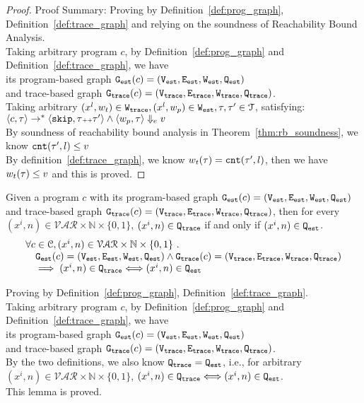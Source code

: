 \begin{proof}
Proof Summary: Proving by Definition~\ref{def:prog_graph}, Definition~\ref{def:trace_graph} and relying on the soundness of Reachability Bound 
Analysis.
\\
Taking arbitrary program $c$,
by Definition~\ref{def:prog_graph} and Definition~\ref{def:trace_graph}, 
we have   
\\
its program-based graph $\mathtt{{G_{est}}}({c}) = (\mathtt{{V_{est}}}, \mathtt{{E_{est}}}, \mathtt{{W_{est}}}, \mathtt{{Q_{est}}})$ 
\\
and 
trace-based graph $\mathtt{{G_{trace}}}({c}) = (\mathtt{{V_{trace}}}, \mathtt{{E_{trace}}}, \mathtt{{W_{trace}}}, \mathtt{{Q_{trace}}})$.
\\
Taking arbitrary 
$(x^l, w_{t}) \in \mathtt{{W_{trace}}}, (x^l, w_{p}) \in \mathtt{{W_{est}}}, \mathtt{\tau}, \mathtt{\tau}' \in \mathcal{T}$, satisfying:
\\
$\langle {c}, \mathtt{\tau} \rangle \to^{*} \langle \mathtt{skip}, \mathtt{\tau}{\scriptscriptstyle ++}\mathtt{\tau}' \rangle 
\land 
\langle w_{p}, \mathtt{\tau} \rangle \Downarrow_e v$
\\
By soundness of reachability bound analysis in Theorem~\ref{thm:rb_soundness}, we know 
$\mathtt{cnt}(\mathtt{\tau}', l) \leq v$
\\
By definition~\ref{def:trace_graph}, we know $w_t(\mathtt{\tau}) = \mathtt{cnt}(\mathtt{\tau}', l)$,
then we have $w_t(\mathtt{\tau}) \leq v$ and this is proved.
\end{proof}
%
\begin{lem}
	\label{lem:queryvertex_map}
	Given a program $c$ with its
	program-based graph $\mathtt{{G_{est}}}({c}) = (\mathtt{{V_{est}}}, \mathtt{{E_{est}}}, \mathtt{{W_{est}}}, \mathtt{{Q_{est}}})$
	and 
	trace-based graph $\mathtt{{G_{trace}}}({c}) = (\mathtt{{V_{trace}}}, \mathtt{{E_{trace}}}, \mathtt{{W_{trace}}}, \mathtt{{Q_{trace}}})$,
	then for every $(x^i, n) \in \mathcal{VAR} \times \mathbb{N}  \times \{0, 1\} $,
	 $(x^i, n) \in \mathtt{{Q_{trace}}}$ if and only if $ (x^i, n) \in \mathtt{{Q_{est}}}$.
	\[
	\begin{array}{l}
	\forall c \in \mathcal{C} , (x^i, n) \in \mathcal{VAR} \times \mathbb{N}  \times \{0, 1\} 
	 ~.~ 
	 \\ \quad
	 \mathtt{{G_{est}}}({c}) = (\mathtt{{V_{est}}}, \mathtt{{E_{est}}}, \mathtt{{W_{est}}}, \mathtt{{Q_{est}}})
	\land 
	\mathtt{{G_{trace}}}({c}) = (\mathtt{{V_{trace}}}, \mathtt{{E_{trace}}}, \mathtt{{W_{trace}}}, \mathtt{{Q_{trace}}})
	\\ \quad
	\implies
	(x^i, n) \in \mathtt{{Q_{trace}}} \Longleftrightarrow  (x^i, n) \in \mathtt{{Q_{est}}}
	\end{array}
	\]
	\end{lem}
\begin{subproof}
Proving by Definition~\ref{def:prog_graph}, Definition~\ref{def:trace_graph}.
\\
Taking arbitrary program $c$,
by Definition~\ref{def:prog_graph} and Definition~\ref{def:trace_graph}, 
we have   
\\
its program-based graph $\mathtt{{G_{est}}}({c}) = (\mathtt{{V_{est}}}, \mathtt{{E_{est}}}, \mathtt{{W_{est}}}, \mathtt{{Q_{est}}})$ 
\\
and 
trace-based graph $\mathtt{{G_{trace}}}({c}) = (\mathtt{{V_{trace}}}, \mathtt{{E_{trace}}}, \mathtt{{W_{trace}}}, \mathtt{{Q_{trace}}})$.
\\
By the two definitions, we also know $\mathtt{{Q_{trace}}}  = \mathtt{{Q_{est}}}$, 
i.e., 
for arbitrary $ (x^i, n) \in \mathcal{VAR} \times \mathbb{N}  \times \{0, 1\} $,
 $(x^i, n) \in \mathtt{{Q_{trace}}} \Longleftrightarrow  (x^i, n) \in \mathtt{{Q_{est}}}$.
 \\
 This lemma is proved.
\end{subproof}
